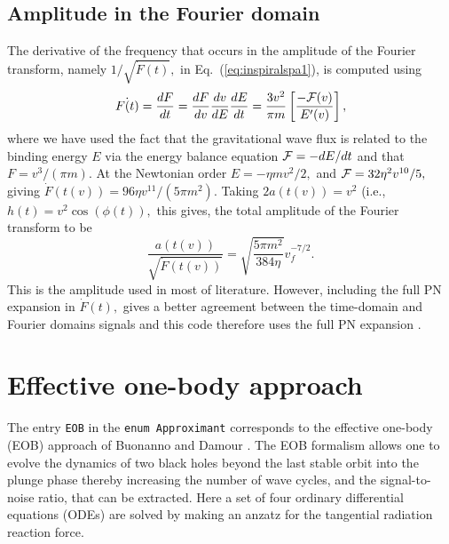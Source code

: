 \subsection{Amplitude in the Fourier domain}
The derivative of the frequency that occurs in the
amplitude of the Fourier transform, namely
$1/\sqrt{\dot{F}(t)},$ in Eq.~(\ref{eq:inspiralspa1}), 
is computed using
\begin{equation}
\dot{F(t)} = \frac{dF}{dt} 
           = \frac{dF}{dv}\frac{dv}{dE}\frac{dE}{dt}
           = \frac{3v^2}{\pi m}\left [\frac{{-\cal F}(v)}{E'(v)} \right ],
\end{equation}
where we have used the fact that the gravitational wave flux
is related to the binding energy $E$ via the energy balance equation
${\cal F} = -dE/dt$ and that $F=v^3/(\pi m).$
At the Newtonian order $E=-\eta m v^2/2,$ and ${\cal F} = 32\eta^2 v^{10}/5,$
giving $\dot{F}(t(v)) = 96\eta v^{11}/(5\pi m^2).$ Taking
$2a(t(v)) = v^2$ (i.e., $h(t) = v^2 \cos (\phi(t)),$ this gives, the 
total amplitude of the Fourier transform to be 
$$\frac{a(t(v))}{\sqrt{\dot{F}(t(v))}} =  \sqrt{\frac{5\pi m^2}{384\eta}} v_f^{-7/2}.$$
This is the amplitude used in most of literature. However, including the
full PN expansion in $\dot{F}(t),$ gives a better agreement between the 
time-domain and Fourier domains signals and this code therefore uses the full
PN expansion \cite{dis2}.

\section{Effective one-body approach}
\label{sec:EOB}
\newcommand{\ww}{\widehat{\omega}}
\newcommand{\wF}{\widehat{\cal F}}
The entry \texttt{EOB} in the {\tt enum Approximant} corresponds to the 
effective one-body (EOB) approach of Buonanno and Damour 
\cite{BD99,BD00,DJS00,TD02}. The EOB formalism allows one to evolve 
the dynamics of two black holes beyond the last stable orbit into 
the plunge phase thereby increasing the number of
wave cycles, and the signal-to-noise ratio, that can be extracted.
Here a set of four ordinary differential equations (ODEs) are solved 
by making an anzatz for the tangential radiation reaction force. 

